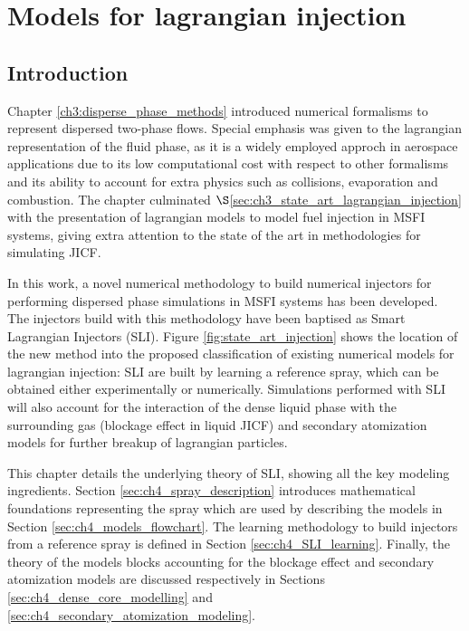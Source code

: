 \chapter{Models for lagrangian injection}
	\label{ch4:sli_development}

\section{Introduction}

Chapter \ref{ch3:disperse_phase_methods} introduced numerical formalisms to represent dispersed two-phase flows. Special emphasis was given to the lagrangian representation of the fluid phase, as it is a widely employed approch in aerospace applications due to its low computational cost with respect to other formalisms and its ability to account for extra physics such as collisions, evaporation and combustion. The chapter culminated  $\S$\ref{sec:ch3_state_art_lagrangian_injection} with the presentation of lagrangian models to model fuel injection in MSFI systems, giving extra attention to the state of the art in methodologies for simulating JICF. 

In this work, a novel numerical methodology to build numerical injectors for performing dispersed phase simulations in MSFI systems has been developed. The injectors build with this methodology have been baptised as Smart Lagrangian Injectors (SLI). Figure \ref{fig:state_art_injection} shows the location of the new method into the proposed classification of existing numerical models for lagrangian injection: SLI are built by learning a reference spray, which can be obtained either experimentally or numerically. Simulations performed with SLI will also account for the interaction of the dense liquid phase with the surrounding gas (blockage effect in liquid JICF) and secondary atomization models for further breakup of lagrangian particles.

This chapter details the underlying theory of SLI, showing all the key modeling ingredients. Section \ref{sec:ch4_spray_description} introduces mathematical foundations representing the spray which are used by describing the models in Section \ref{sec:ch4_models_flowchart}. The learning methodology to build injectors from a reference spray is defined in Section \ref{sec:ch4_SLI_learning}. Finally, the theory of the models blocks accounting for the blockage effect and secondary atomization models are discussed respectively in Sections \ref{sec:ch4_dense_core_modelling} and \ref{sec:ch4_secondary_atomization_modeling}.
 

